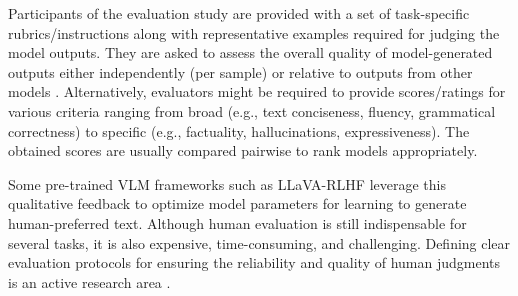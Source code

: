 Participants of the evaluation study are provided with a set of task-specific rubrics/instructions along with representative examples required for judging the model outputs. They are asked to assess the overall quality of model-generated outputs either independently (per sample) \cite{groovist} or relative to outputs from other models \cite{rovist}. Alternatively, evaluators might be required to provide scores/ratings for various criteria ranging from broad (e.g., text conciseness, fluency, grammatical correctness) to specific (e.g., factuality, hallucinations, expressiveness). The obtained scores are usually compared pairwise to rank models appropriately.

Some pre-trained VLM frameworks such as LLaVA-RLHF \cite{llava_rlhf} leverage this qualitative feedback to optimize model parameters for learning to generate human-preferred text. Although human evaluation is still indispensable for several tasks, it is also expensive, time-consuming, and challenging. Defining clear evaluation protocols for ensuring the reliability and quality of human judgments is an active research area \cite{human_eval_protocols1,human_eval_protocols2}.